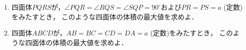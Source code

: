 \documentclass[../../main.tex]{subfiles}
\begin{document}
\begin{enumerate}
  \item 四面体$PQRS$が，$\angle PQR=\angle RQS=\angle SQP={90}^\circ$および$PR=PS=a$ (定数)をみたすとき，
    このような四面体の体積の最大値を求めよ．
  \item 四面体$ABCD$が，$AB=BC=CD=DA=a$ (定数)をみたすとき，
    このような四面体の体積の最大値を求めよ．
\end{enumerate}
\end{document}
